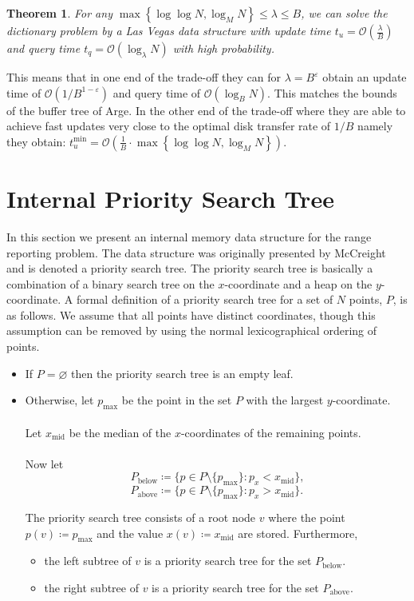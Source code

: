 \documentclass[twoside,11pt,openright]{report}
\def \epsilon {\varepsilon}
\newtheorem{theorem}{Theorem}
\begin{document}
\begin{theorem}
For any $\max\left\lbrace \log\log N, \log_M N \right\rbrace \leq \lambda \leq B$, we can solve the dictionary problem by a Las Vegas data structure with update time $t_u = \mathcal{O}(\frac{\lambda}{B})$ and query time $t_q = \mathcal{O}(\log_\lambda N)$ with high probability.
\end{theorem}

This means that in one end of the trade-off they can for $\lambda = B^\epsilon$ obtain an update time of $\mathcal{O}(1/B^{1-\epsilon})$ and query time of $\mathcal{O}(\log_B N)$. This matches the bounds of the buffer tree of Arge. In the other end of the trade-off where they are able to achieve fast updates very close to the optimal disk transfer rate of $1/B$ namely they obtain: $t_u^{\min} = \mathcal{O}(\frac{1}{B} \cdot \max\left\lbrace \log\log N, \log_M N \right\rbrace)$.

\chapter{Internal Priority Search Tree}
\label{chp:internal_pst}
In this section we present an internal memory data structure for the range reporting problem. The data structure was originally presented by McCreight~\cite{DBLP:journals/siamcomp/McCreight85} and is denoted a priority search tree. The priority search tree is basically a combination of a binary search tree on the $x$-coordinate and a heap on the $y$-coordinate. A formal definition of a priority search tree for a set of $N$ points, $P$, is as follows. We assume that all points have distinct coordinates, though this assumption can be removed by using the normal lexicographical ordering of points.

\begin{itemize}
	\item If $P = \varnothing$ then the priority search tree is an empty leaf.
	\item Otherwise, let $p_\text{max}$ be the point in the set $P$ with the largest $y$-coordinate. \\ \\
			Let $x_{\text{mid}}$ be the median of the $x$-coordinates of the remaining points. \\ \\ Now let
			$$ P_\text{below} \coloneqq \{p \in P \setminus \{p_\text{max} \} : p_x < x_\text{mid} \}\text{,}$$
			$$ P_\text{above} \coloneqq \{p \in P \setminus \{p_\text{max} \} : p_x > x_\text{mid} \}\text{.}$$
			
			The priority search tree consists of a root node $v$ where the point \\
			$p(v) \coloneqq p_{\text{max}}$ and the value $x(v) \coloneqq x_{\text{mid}}$ are stored. Furthermore,
			\begin{itemize}[label=$\bullet$]
				\item the left subtree of $v$ is a priority search tree for the set $P_{\text{below}}$.
				\item the right subtree of $v$ is a priority search tree for the set $P_{\text{above}}$.
			\end{itemize}
\end{itemize}
\end{document}
